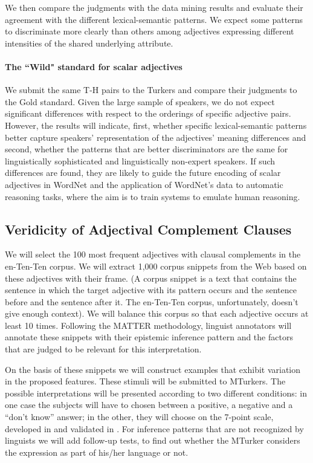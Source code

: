\documentclass[10pt]{article}
\begin{document}
\noindent 
We then compare the judgments with the data mining results and evaluate their agreement with the different lexical-semantic patterns. 
We expect some patterns to discriminate more clearly than others among adjectives expressing different intensities of the shared underlying attribute. 

\paragraph{The ``Wild" standard for scalar adjectives}
We submit the same T-H pairs to the Turkers and compare their judgments to the Gold standard. Given the large sample 
of speakers, we do not expect significant differences with respect to the orderings of specific adjective pairs. However, 
the results will indicate, first, whether specific lexical-semantic patterns better capture speakers' representation of the adjectives' 
meaning differences and second, whether the patterns that are better discriminators are the same for linguistically 
sophisticated and linguistically non-expert speakers. If such differences are found, they are likely to guide the future encoding of scalar adjectives 
in WordNet and the application of WordNet's data to automatic reasoning tasks, where the aim is to train systems to emulate human reasoning. 

\vspace{-.1in}
\subsection{Veridicity of Adjectival Complement Clauses}

We will select the 100 most frequent adjectives with clausal complements in the en-Ten-Ten corpus. We will extract 1,000 corpus snippets from the Web based on these adjectives with their frame. (A corpus snippet is a text that contains the sentence in which the target adjective with its pattern occurs and the sentence before and the sentence after it. The en-Ten-Ten corpus, unfortunately, doesn’t give enough context). We will balance this corpus so that each adjective occurs at least 10 times. Following the MATTER methodology, linguist annotators will annotate these snippets with their epistemic inference pattern and the factors that are judged to be relevant for this interpretation.

On the basis of these snippets we will construct examples that exhibit variation in the proposed features. These stimuli will be submitted to MTurkers. 
The possible interpretations will be presented according to two different conditions: in one case the subjects will have to chosen between a positive, a negative and a ``don’t know'' answer; in the other, they will choose on the 7-point scale, developed in \cite{sauri:2008phd,sauri-pustejovsky2012} and validated in \cite{demarneff+manning+potts:2012}.
For inference patterns that are not recognized by linguists we will add follow-up tests, to find out whether the MTurker considers the expression as part of his/her language or not.
\end{document}
